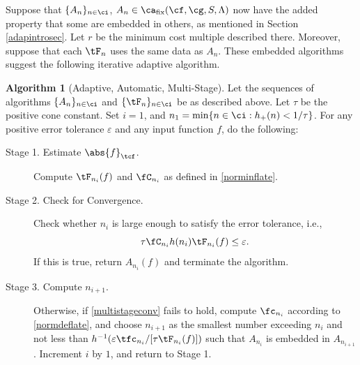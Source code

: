 \documentclass[]{elsarticle}
\DeclareMathOperator{\fix}{fix}
\theoremstyle{definition}
\newtheorem{algo}{Algorithm}
\theoremstyle{remark}
\newcommand{\Ftnorm}[1]{\abs{#1}_{\tcf}}
\begin{document}
Suppose that $\{A_n\}_{n \in \ci}$, $A_n  \in \ca_{\fix}(\cf,\cg,S,\Lambda)$ now have the added property that some are embedded in others, as mentioned in Section \ref{adapintrosec}.  Let $r$ be the minimum cost multiple described there.  Moreover, suppose that each $\tF_n$ uses the same data as $A_n$. These embedded algorithms suggest the following iterative adaptive algorithm.

\begin{algo}[Adaptive, Automatic, Multi-Stage] \label{multistagealgo}  Let the sequences of algorithms $\{A_n\}_{n \in \ci}$ and  $\{\tF_n\}_{n \in \ci}$ be as described above.  Let $\tau$ be the positive cone constant. Set $i=1$, and $n_1 = \min\{ n \in \ci : h_+(n) < 1/\tau\}$. For any positive error tolerance $\varepsilon$ and any input function $f$, do the following:
\begin{description}

\item [Stage 1. Estimate $\Ftnorm{f}$.] Compute $\tF_{n_i}(f)$ and $\fC_{n_i}$ as defined in \eqref{norminflate}.  

\item [Stage 2. Check for Convergence.] Check whether $n_i$ is large enough to satisfy the error tolerance, i.e., 
\begin{equation} \label{multistageconv}
\tau \fC_{n_i} h(n_i)\tF_{n_i}(f) \le \varepsilon.
\end{equation}
If this is true, return $A_{n_i}(f)$ and terminate the algorithm.

\item[Stage 3. Compute $n_{i+1}$.]  Otherwise, if \eqref{multistageconv} fails to hold, compute $\fc_{n_i}$ according to \eqref{normdeflate}, and choose $n_{i+1}$ as the smallest number exceeding $n_i$ and not less than $h^{-1}(\varepsilon \tfc_{n_i}/[\tau \tF_{n_i}(f)])$ such that $A_{n_{i}}$ is embedded in $A_{n_{i+1}}$. Increment $i$ by $1$, and return to Stage 1.  

\end{description}  
\end{algo}
\end{document}

